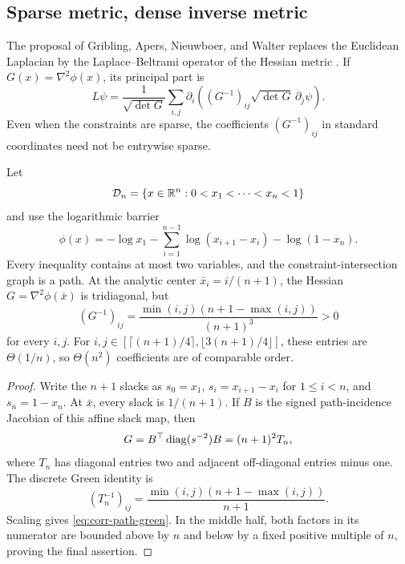 \subsection{Sparse metric, dense inverse metric}
\label{sec:corrections-densification}

The proposal of Gribling, Apers, Nieuwboer, and Walter replaces the Euclidean
Laplacian by the Laplace--Beltrami operator of the Hessian metric
\cite{gribling2025-self-concordant-schrodinger-operators-spectral}.  If
$G(x)=\nabla^2\phi(x)$, its principal part is
\begin{equation}
 L\psi=\frac1{\sqrt{\det G}}
 \sum_{i,j}\partial_i\!\left(
 (G^{-1})_{ij}\sqrt{\det G}\,\partial_j\psi
 \right).                                                \label{eq:corr-laplace-beltrami}
\end{equation}
Even when the constraints are sparse, the coefficients $(G^{-1})_{ij}$ in
standard coordinates need not be entrywise sparse.

\begin{theorem}
\label{thm:corr-path-simplex}
Let
\[
 \mathcal D_n=\{x\in\mathbb{R}^n:0<x_1<\cdots<x_n<1\}
\]
and use the logarithmic barrier
\begin{equation}
 \phi(x)=-\log x_1-\sum_{i=1}^{n-1}\log(x_{i+1}-x_i)
          -\log(1-x_n).                                  \label{eq:corr-path-barrier}
\end{equation}
Every inequality contains at most two variables, and the
constraint-intersection graph is a path.  At the analytic center
$\bar x_i=i/(n+1)$, the Hessian $G=\nabla^2\phi(\bar x)$ is tridiagonal, but
\begin{equation}
 (G^{-1})_{ij}
 =\frac{\min(i,j)(n+1-\max(i,j))}{(n+1)^3}>0             \label{eq:corr-path-green}
\end{equation}
for every $i,j$.  For
$i,j\in[\lceil(n+1)/4\rceil,\lfloor3(n+1)/4\rfloor]$,
these entries are $\Theta(1/n)$, so $\Theta(n^2)$ coefficients are of
comparable order.
\end{theorem}

\begin{proof}
Write the $n+1$ slacks as
$s_0=x_1$, $s_i=x_{i+1}-x_i$ for $1\leq i<n$, and
$s_n=1-x_n$.  At $\bar x$, every slack is $1/(n+1)$.  If $B$ is the signed
path-incidence Jacobian of this affine slack map, then
\[
 G=B^\top\operatorname{diag}(s^{-2})B=(n+1)^2T_n,
\]
where $T_n$ has diagonal entries two and adjacent off-diagonal entries
minus one.  The discrete Green identity is
\[
 (T_n^{-1})_{ij}
 =\frac{\min(i,j)(n+1-\max(i,j))}{n+1}.
\]
Scaling gives \eqref{eq:corr-path-green}.  In the middle half, both factors
in its numerator are bounded above by $n$ and below by a fixed positive
multiple of $n$, proving the final assertion.
\end{proof}

